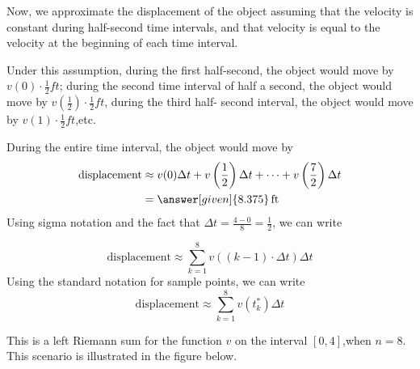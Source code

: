 \documentclass{ximera}
\begin{document}
\begin{example}
\begin{explanation}
\begin{image}
\end{image}
Now, we approximate the displacement of the object assuming that the velocity is constant during half-second time intervals, and that velocity is equal to the velocity at the beginning of each time interval.


 Under this assumption,  during the first half-second, the object would move by $v(0)\cdot\frac{1}{2} \unit{ft}$;  during the second time interval of half a  second, the object would move by $v\left(\frac{1}{2}\right)\cdot\frac{1}{2} \unit{ft}$, during the third half- second interval, the object would move by $v(1)\cdot\frac{1}{2} \unit{ft}$,etc.


 During the entire time interval, the object would move by
\begin{align*}
   \text{displacement} &\approx v(0)\Delta t+v\left(\frac{1}{2}\right)\Delta t+ \cdots +v\left(\frac{7}{2}\right)\Delta t\\
   &=\answer[given]{8.375} \unit{ft}
\end{align*}
Using sigma notation and the fact that $\Delta t=\frac{4-0}{8}=\frac{1}{2}$, we can write

  \[
   \text{displacement}\approx \sum_{k=1}^8v((k-1)\cdot\Delta t)\Delta t
\]
Using the standard notation for sample points, we can write
 \[
   \text{displacement}\approx \sum_{k=1}^8v(t_{k}^*)\Delta t
  \]

  This is a left Riemann sum for the function $v$ on the interval $[0,4]$,when $n=8$.
This scenario is illustrated in the figure below.



\end{explanation}
\end{example}
\end{document}
